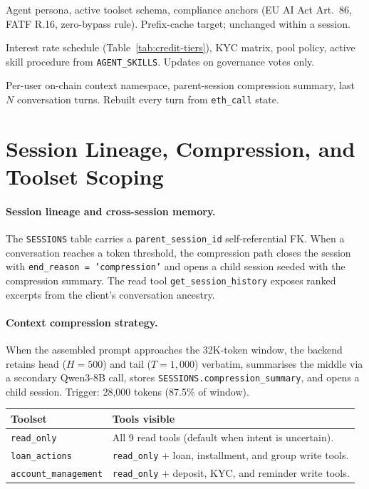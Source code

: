 \documentclass[12pt,a4paper]{report}
\newcommand{\tableheadcolor}{\rowcolor{TableHeadBg}}
\begin{document}
\begin{description}[noitemsep,leftmargin=0pt]
\item[\textbf{Stable tier.}] Agent persona, active toolset schema, compliance anchors (EU AI Act Art.~86, FATF R.16, zero-bypass rule). Prefix-cache target; unchanged within a session.
\item[\textbf{Context tier.}] Interest rate schedule (Table~\ref{tab:credit-tiers}), KYC matrix, pool policy, active skill procedure from \texttt{AGENT\_SKILLS}. Updates on governance votes only.
\item[\textbf{Volatile tier.}] Per-user on-chain context namespace, parent-session compression summary, last $N$ conversation turns. Rebuilt every turn from \texttt{eth\_call} state.
\end{description}

\section{Session Lineage, Compression, and Toolset Scoping}

\paragraph{Session lineage and cross-session memory.}
The \texttt{SESSIONS} table carries a \texttt{parent\_session\_id} self-referential FK. When a conversation reaches a token threshold, the compression path closes the session with \texttt{end\_reason = 'compression'} and opens a child session seeded with the compression summary. The read tool \texttt{get\_session\_history} exposes ranked excerpts from the client's conversation ancestry.

\paragraph{Context compression strategy.}
When the assembled prompt approaches the 32K-token window, the backend retains head ($H{=}500$) and tail ($T{=}1{,}000$) verbatim, summarises the middle via a secondary Qwen3-8B call, stores \texttt{SESSIONS.compression\_summary}, and opens a child session. Trigger: 28{,}000 tokens (87.5\% of window).

\begin{table}[H]
\centering
\begin{tabular}{p{3.5cm}p{9cm}}
\toprule
\tableheadcolor
\textbf{Toolset} & \textbf{Tools visible} \\
\midrule
\texttt{read\_only} & All 9 read tools (default when intent is uncertain). \\
\texttt{loan\_actions} & \texttt{read\_only} $+$ loan, installment, and group write tools. \\
\texttt{account\_management} & \texttt{read\_only} $+$ deposit, KYC, and reminder write tools. \\
\bottomrule
\end{tabular}
\end{table}
\end{document}
